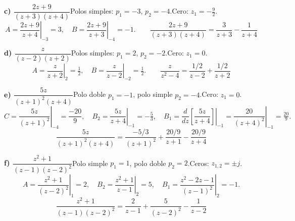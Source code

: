 \documentclass[10pt,a4paper]{article}
\begin{document}
\begin{figure}[H]
\centering

\end{figure}


\medskip

\noindent\textbf{c) $\dfrac{2z+9}{(z+3)(z+4)}$}\quad Polos simples: $p_1=-3$, $p_2=-4$.\quad Cero: $z_1=-\tfrac{9}{2}$.
\[
	A = \left.\frac{2z+9}{z+4}\right|_{-3} = 3,\quad
	B = \left.\frac{2z+9}{z+3}\right|_{-4} = -1.
	\qquad
	\boxed{\frac{2z+9}{(z+3)(z+4)} = \frac{3}{z+3} - \frac{1}{z+4}}
\]

\begin{figure}[H]
\centering

\end{figure}


\medskip

\noindent\textbf{d) $\dfrac{z}{(z-2)(z+2)}$}\quad Polos simples: $p_1=2$, $p_2=-2$.\quad Cero: $z_1=0$.
\[
	A = \left.\frac{z}{z+2}\right|_2 = \tfrac{1}{2},\quad
	B = \left.\frac{z}{z-2}\right|_{-2} = \tfrac{1}{2}.
	\qquad
	\boxed{\frac{z}{z^2-4} = \frac{1/2}{z-2} + \frac{1/2}{z+2}}
\]

\begin{figure}[H]
\centering

\end{figure}


\medskip

\noindent\textbf{e) $\dfrac{5z}{(z+1)^2(z+4)}$}\quad Polo doble $p_1=-1$, polo simple $p_2=-4$.\quad Cero: $z_1=0$.
\[
	C = \left.\frac{5z}{(z+1)^2}\right|_{-4} = \frac{-20}{9}, \quad
	B_2 = \left.\frac{5z}{z+4}\right|_{-1} = -\tfrac{5}{3}, \quad
	B_1 = \left.\frac{d}{dz}\!\left[\frac{5z}{z+4}\right]\right|_{-1}
	= \left.\frac{20}{(z+4)^2}\right|_{-1} = \tfrac{20}{9}.
\]
\[
	\boxed{\frac{5z}{(z+1)^2(z+4)} = \frac{-5/3}{(z+1)^2} + \frac{20/9}{z+1} - \frac{20/9}{z+4}}
\]

\begin{figure}[H]
\centering

\end{figure}


\medskip

\noindent\textbf{f) $\dfrac{z^2+1}{(z-1)(z-2)^2}$}\quad Polo simple $p_1=1$, polo doble $p_2=2$.\quad Ceros: $z_{1,2}=\pm j$.
\[
	A = \left.\frac{z^2+1}{(z-2)^2}\right|_1 = 2, \quad
	B_2 = \left.\frac{z^2+1}{z-1}\right|_2 = 5, \quad
	B_1 = \left.\frac{z^2-2z-1}{(z-1)^2}\right|_2 = -1.
\]
\[
	\boxed{\frac{z^2+1}{(z-1)(z-2)^2} = \frac{2}{z-1} + \frac{5}{(z-2)^2} - \frac{1}{z-2}}
\]
\end{document}
